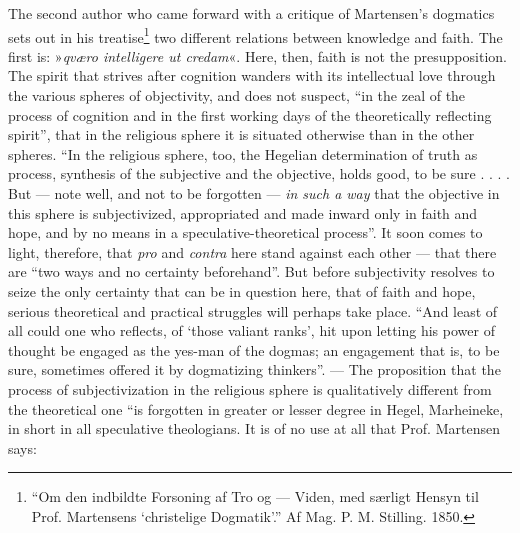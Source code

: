 \documentclass[12pt,a4paper]{book}
\newcommand{\opage}[1]{\marginnote{\footnotesize\textit{[#1]}}}
\begin{document}
\opage{28}\setcounter{footnote}{0}%
The second author who came forward with a critique of Martensen's dogmatics sets out in his treatise\footnote{``Om den indbildte Forsoning af Tro og --- Viden, med særligt Hensyn til Prof. Martensens `christelige Dogmatik'.'' Af Mag. P. M. Stilling. 1850.} two different relations between knowledge and faith. The first is: »\emph{\textit{qværo intelligere ut credam}}«. Here, then, faith is not the presupposition. The spirit that strives after cognition wanders with its intellectual love through the various spheres of objectivity, and does not suspect, ``in the zeal of the process of cognition and in the first working days of the theoretically reflecting spirit'', that in the religious sphere it is situated otherwise than in the other spheres. ``In the religious sphere, too, the Hegelian determination of truth as process, synthesis of the subjective and the objective, holds good, to be sure . . . . But --- note well, and not to be forgotten --- \emph{in such a way} that the objective in this sphere is subjectivized, appropriated and made inward only in faith and hope, and by no means in a speculative-theoretical process''. It soon comes to light, therefore, that \textit{pro} and \textit{contra} here stand against each other --- that there are ``two ways and no certainty beforehand''. But before subjectivity resolves to seize the only certainty that can be in question here, that of faith and hope, serious theoretical and practical struggles will perhaps take place. ``And least of all could one who reflects, of `those valiant ranks', hit upon letting his power of thought be engaged as the yes-man of the dogmas; an engagement that is, to be sure, sometimes offered it by dogmatizing thinkers''. --- The proposition that the process of subjectivization in the religious sphere is qualitatively different from the theoretical one ``is forgotten in greater or lesser degree in Hegel, Marheineke, in short in all speculative theologians. It is of no use at all that Prof. Martensen says:
\end{document}
